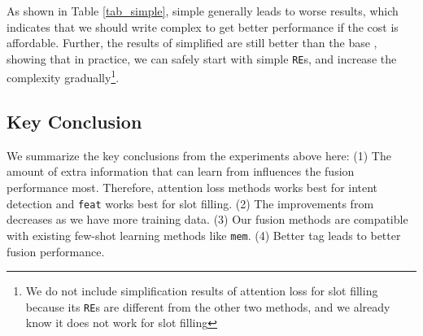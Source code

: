 As shown in Table \ref{tab_simple}, simple \RE generally leads to worse results, which indicates that we should write complex \RE to get better performance if the cost is affordable.
Further, the results of simplified \RE are still better than the base \BLSTM, showing that in practice, we can safely start with simple \texttt{RE}s, and increase the complexity gradually\footnote{
We do not include simplification results of attention loss for slot filling because its \texttt{RE}s are different from the other two methods, and we already know it does not work for slot filling}.

\subsection{Key Conclusion}
We summarize the key conclusions from the experiments above here: 
(1) The amount of extra information that \NN can learn from \RE influences the fusion performance most. Therefore, attention loss methods works best for intent detection and \texttt{feat} works best for slot filling.
(2) The improvements from \RE decreases as we have more training data.
(3) Our fusion methods are compatible with existing few-shot learning methods like \texttt{mem}.
(4) Better \RE tag leads to better fusion performance.
